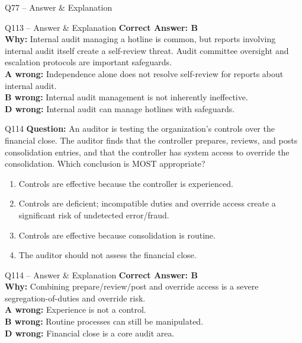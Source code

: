 \documentclass[aspectratio=169,10pt]{beamer}
\begin{document}
\begin{frame}[t]{Q77 -- Answer \& Explanation}
	\begin{frame}[t]{Q113 -- Answer \& Explanation}
		\small
		\textbf{Correct Answer: B} \\[4pt]
		\textbf{Why:} Internal audit managing a hotline is common, but reports involving internal audit itself create a self-review threat. Audit committee oversight and escalation protocols are important safeguards. \\[4pt]
		\textbf{A wrong:} Independence alone does not resolve self-review for reports about internal audit. \\[2pt]
		\textbf{B wrong:} Internal audit management is not inherently ineffective. \\[2pt]
		\textbf{D wrong:} Internal audit can manage hotlines with safeguards.
	\end{frame}
	
	\begin{frame}[t]{Q114}
		\small
		\textbf{Question:} An auditor is testing the organization's controls over the financial close. The auditor finds that the controller prepares, reviews, and posts consolidation entries, and that the controller has system access to override the consolidation. Which conclusion is MOST appropriate?
		\begin{enumerate}[label=\Alph*.,itemsep=1pt,topsep=2pt]
			\item Controls are effective because the controller is experienced.
			\item Controls are deficient; incompatible duties and override access create a significant risk of undetected error/fraud.
			\item Controls are effective because consolidation is routine.
			\item The auditor should not assess the financial close.
		\end{enumerate}
	\end{frame}
	
	\begin{frame}[t]{Q114 -- Answer \& Explanation}
		\small
		\textbf{Correct Answer: B} \\[4pt]
		\textbf{Why:} Combining prepare/review/post and override access is a severe segregation-of-duties and override risk. \\[4pt]
		\textbf{A wrong:} Experience is not a control. \\[2pt]
		\textbf{B wrong:} Routine processes can still be manipulated. \\[2pt]
		\textbf{D wrong:} Financial close is a core audit area.
	\end{frame}
	

\end{frame}
\end{document}
